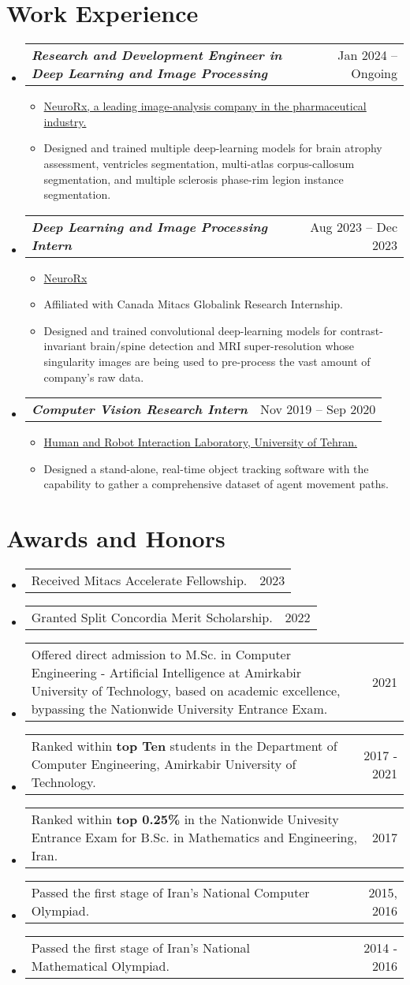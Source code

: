 \documentclass[letterpaper,11pt]{article}
\makeatletter
\newcommand{\resumeItemDate}[2]{
  \vspace{-2pt}\item\small
    \begin{tabular*}{0.975\textwidth}[t]{p{0.85\textwidth}@{\extracolsep{\fill}}r}
      #1 & #2 
    \end{tabular*}\vspace{-2pt}
}
\newcommand{\resumeSubItem}[1]{
  \item\small{
    {#1 \vspace{-2pt}}
  }
}
\newcommand{\resumeSubheading}[2]{
  \vspace{-2pt}\item
    \begin{tabular*}{0.983\textwidth}[t]{l@{\extracolsep{\fill}}r}
      \textbf{\textit{#1}} & \small #2 
    \end{tabular*}\vspace{-7pt}
}
\newcommand{\resumeSubHeadingListStart}{\begin{itemize}[leftmargin=9pt]}
\newcommand{\resumeSubHeadingListEnd}{\end{itemize}}
\newcommand{\resumeSubItemListStart}{\begin{itemize}[leftmargin=17pt]}
\newcommand{\resumeSubItemListEnd}{\end{itemize}\vspace{-5pt}}
\makeatother
\begin{document}
\section{Work Experience}
    \resumeSubHeadingListStart
        \resumeSubheading{Research and Development Engineer in Deep Learning and Image Processing}{Jan 2024 -- Ongoing}
            \resumeSubItemListStart
                \resumeSubItem{\href{https://neurorx.com/}{NeuroRx, a leading image-analysis company in the pharmaceutical industry.}}
                \resumeSubItem{Designed and trained multiple deep-learning models for brain atrophy assessment, ventricles segmentation, multi-atlas corpus-callosum segmentation, and multiple sclerosis phase-rim legion instance segmentation.}
            \resumeSubItemListEnd
        \resumeSubheading{Deep Learning and Image Processing Intern}{Aug 2023 -- Dec 2023}
            \resumeSubItemListStart
                \resumeSubItem{\href{https://neurorx.com/}{NeuroRx}}
                \resumeSubItem{Affiliated with Canada Mitacs Globalink Research Internship.}
                \resumeSubItem{Designed and trained convolutional deep-learning models for contrast-invariant brain/spine detection and MRI super-resolution
                whose singularity images are being used to pre-process the vast amount of company's raw data.}
            \resumeSubItemListEnd

        \resumeSubheading{Computer Vision Research Intern}{Nov 2019 -- Sep 2020}
        \resumeSubItemListStart
            \resumeSubItem{\href{https://taarlab.com/}{Human and Robot Interaction Laboratory, University of Tehran.}}

            \resumeSubItem{Designed a stand-alone, real-time object tracking software with the capability to gather a comprehensive dataset of agent movement paths.}
        \resumeSubItemListEnd
    \resumeSubHeadingListEnd

\section{Awards and Honors}
    \resumeSubHeadingListStart
        \resumeItemDate{Received Mitacs Accelerate Fellowship.}{2023}
        \resumeItemDate{Granted Split Concordia Merit Scholarship.}{2022}
        \resumeItemDate{Offered direct admission to M.Sc. in Computer Engineering - Artificial Intelligence at Amirkabir University of Technology, based on academic excellence, bypassing the Nationwide University Entrance Exam.}{2021}
        \resumeItemDate{Ranked within \textbf{top Ten} students in the Department of Computer Engineering, Amirkabir University of Technology.}{2017 - 2021}
        \resumeItemDate{Ranked within \textbf{top 0.25\%} in the Nationwide Univesity Entrance Exam for B.Sc. in Mathematics and Engineering, Iran.}{2017}
        \resumeItemDate{Passed the first stage of Iran’s National Computer Olympiad.}{2015, 2016}
        \resumeItemDate{Passed the first stage of Iran’s National Mathematical Olympiad.}{2014 - 2016}
    \resumeSubHeadingListEnd
\end{document}
